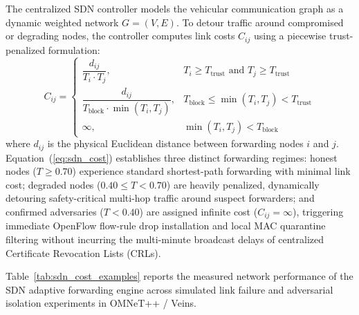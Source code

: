 \documentclass[conference]{IEEEtran}
\begin{document}
The centralized SDN controller models the vehicular communication graph as a dynamic weighted network $G = (V, E)$. To detour traffic around compromised or degrading nodes, the controller computes link costs $C_{ij}$ using a piecewise trust-penalized formulation:
\begin{equation}
C_{ij} = \begin{cases} 
\dfrac{d_{ij}}{T_i \cdot T_j}, & T_i \ge T_{\text{trust}} \text{ and } T_j \ge T_{\text{trust}} \\[7pt] 
\dfrac{d_{ij}}{T_{\text{block}} \cdot \min(T_i, T_j)}, & T_{\text{block}} \le \min(T_i, T_j) < T_{\text{trust}} \\[7pt] 
\infty, & \min(T_i, T_j) < T_{\text{block}} 
\end{cases}
\label{eq:sdn_cost}
\end{equation}
where $d_{ij}$ is the physical Euclidean distance between forwarding nodes $i$ and $j$. Equation~(\ref{eq:sdn_cost}) establishes three distinct forwarding regimes: honest nodes ($T \ge 0.70$) experience standard shortest-path forwarding with minimal link cost; degraded nodes ($0.40 \le T < 0.70$) are heavily penalized, dynamically detouring safety-critical multi-hop traffic around suspect forwarders; and confirmed adversaries ($T < 0.40$) are assigned infinite cost ($C_{ij} = \infty$), triggering immediate OpenFlow flow-rule drop installation and local MAC quarantine filtering without incurring the multi-minute broadcast delays of centralized Certificate Revocation Lists (CRLs).

Table~\ref{tab:sdn_cost_examples} reports the measured network performance of the SDN adaptive forwarding engine across simulated link failure and adversarial isolation experiments in OMNeT++ / Veins. 
\end{document}
